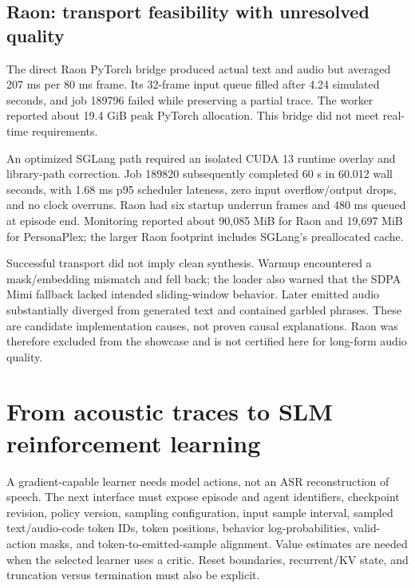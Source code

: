 \documentclass{article}
\begin{document}
\subsection{Raon: transport feasibility with unresolved quality}\label{sec:raon}
The direct Raon PyTorch bridge produced actual text and audio but averaged 207 ms per 80 ms frame. Its 32-frame input queue filled after 4.24 simulated seconds, and job 189796 failed while preserving a partial trace. The worker reported about 19.4 GiB peak PyTorch allocation. This bridge did not meet real-time requirements.

An optimized SGLang path required an isolated CUDA 13 runtime overlay and library-path correction. Job 189820 subsequently completed 60 s in 60.012 wall seconds, with 1.68 ms p95 scheduler lateness, zero input overflow/output drops, and no clock overruns. Raon had six startup underrun frames and 480 ms queued at episode end. Monitoring reported about 90,085 MiB for Raon and 19,697 MiB for PersonaPlex; the larger Raon footprint includes SGLang's preallocated cache.

Successful transport did not imply clean synthesis. Warmup encountered a mask/embedding mismatch and fell back; the loader also warned that the SDPA Mimi fallback lacked intended sliding-window behavior. Later emitted audio substantially diverged from generated text and contained garbled phrases. These are candidate implementation causes, not proven causal explanations. Raon was therefore excluded from the showcase and is not certified here for long-form audio quality.

\section{From acoustic traces to SLM reinforcement learning}
A gradient-capable learner needs model actions, not an ASR reconstruction of speech. The next interface must expose episode and agent identifiers, checkpoint revision, policy version, sampling configuration, input sample interval, sampled text/audio-code token IDs, token positions, behavior log-probabilities, valid-action masks, and token-to-emitted-sample alignment. Value estimates are needed when the selected learner uses a critic. Reset boundaries, recurrent/KV state, and truncation versus termination must also be explicit.
\end{document}
